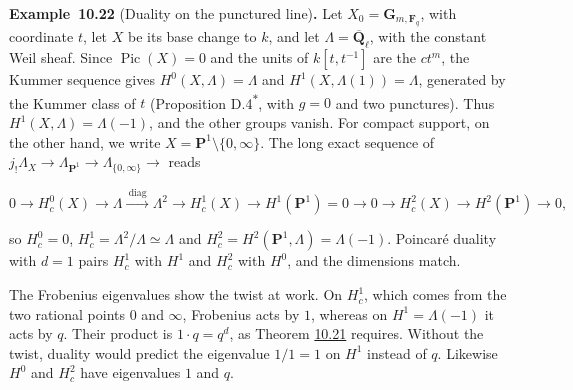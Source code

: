 \documentclass[11pt]{article}
\newenvironment{bpstatement}[2]{\par\addvspace{0.6\baselineskip}\noindent\textbf{#1}#2\textbf{.}\enspace\ignorespaces}
  {\par\addvspace{0.4\baselineskip}}
\newcommand{\bpout}[1]{#1\textsuperscript{\hyperlink{bp-outside}{\ensuremath{\ast}}}}
\begin{document}
\label{bp168}%
\begin{bpstatement}{Example~10.22}{ (Duality on the punctured line)}
Let \(X_0=\mathbf G_{m,\mathbf F_q}\), with coordinate \(t\), let \(X\) be its base change to \(k\), and let \(\Lambda=\overline{\mathbf Q}_\ell\), with the constant Weil sheaf. Since \(\operatorname{Pic}(X)=0\) and the units of \(k[t,t^{-1}]\) are the \(ct^m\), the Kummer sequence gives \(H^0(X,\Lambda)=\Lambda\) and \(H^1(X,\Lambda(1))=\Lambda\), generated by the Kummer class of \(t\) (Proposition \bpout{D.4}, with \(g=0\) and two punctures). Thus \(H^1(X,\Lambda)=\Lambda(-1)\), and the other groups vanish. For compact support, on the other hand, we write \(X=\mathbf P^1\setminus\{0,\infty\}\). The long exact sequence of \(j_!\Lambda_X\to\Lambda_{\mathbf P^1}\to\Lambda_{\{0,\infty\}}\to\) reads

\[
0\to H^0_c(X)\to\Lambda\xrightarrow{\ \text{diag}\ }\Lambda^2\to H^1_c(X)
\to H^1(\mathbf P^1)=0\to0\to H^2_c(X)\to H^2(\mathbf P^1)\to0,
\]

so \(H^0_c=0\), \(H^1_c=\Lambda^2/\Lambda\simeq\Lambda\) and \(H^2_c=H^2(\mathbf P^1,\Lambda)=\Lambda(-1)\). Poincaré duality with \(d=1\) pairs \(H^1_c\) with \(H^1\) and \(H^2_c\) with \(H^0\), and the dimensions match.

The Frobenius eigenvalues show the twist at work. On \(H^1_c\), which comes from the two rational points \(0\) and \(\infty\), Frobenius acts by \(1\), whereas on \(H^1=\Lambda(-1)\) it acts by \(q\). Their product is \(1\cdot q=q^d\), as Theorem \hyperref[bp165]{10.21} requires. Without the twist, duality would predict the eigenvalue \(1/1=1\) on \(H^1\) instead of \(q\). Likewise \(H^0\) and \(H^2_c\) have eigenvalues \(1\) and \(q\).
\end{bpstatement}
\end{document}
